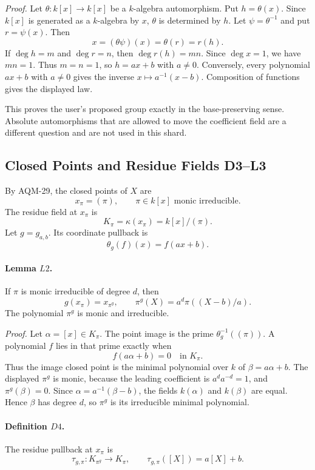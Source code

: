 \emph{Proof.}
Let \(\theta:k[x]\to k[x]\) be a \(k\)-algebra automorphism.  Put
\(h=\theta(x)\).  Since \(k[x]\) is generated as a \(k\)-algebra by \(x\),
\(\theta\) is determined by \(h\).  Let \(\psi=\theta^{-1}\) and put
\(r=\psi(x)\).  Then
\[
  x=(\theta\psi)(x)=\theta(r)=r(h).
\]
If \(\deg h=m\) and \(\deg r=n\), then \(\deg r(h)=mn\).  Since
\(\deg x=1\), we have \(mn=1\).  Thus \(m=n=1\), so \(h=ax+b\) with
\(a\ne0\).  Conversely, every polynomial \(ax+b\) with \(a\ne0\) gives the
inverse \(x\mapsto a^{-1}(x-b)\).  Composition of functions gives the
displayed law.

This proves the user's proposed group exactly in the base-preserving sense.
Absolute automorphisms that are allowed to move the coefficient field are a
different question and are not used in this shard.

\subsection{Closed Points and Residue Fields D3--L3}

By AQM-29, the closed points of \(X\) are
\[
  x_\pi=(\pi),\qquad \pi\in k[x]\text{ monic irreducible}.
\]
The residue field at \(x_\pi\) is
\[
  K_\pi=\kappa(x_\pi)=k[x]/(\pi).
\]
Let \(g=g_{a,b}\).  Its coordinate pullback is
\[
  \theta_g(f)(x)=f(ax+b).
\]

\paragraph{Lemma \(L2\).}
If \(\pi\) is monic irreducible of degree \(d\), then
\[
  g(x_\pi)=x_{\pi^g},\qquad
  \pi^g(X)=a^d\pi((X-b)/a).
\]
The polynomial \(\pi^g\) is monic and irreducible.

\emph{Proof.}
Let \(\alpha=[x]\in K_\pi\).  The point image is the prime
\(\theta_g^{-1}((\pi))\).  A polynomial \(f\) lies in that prime exactly when
\[
  f(a\alpha+b)=0\quad\text{in }K_\pi.
\]
Thus the image closed point is the minimal polynomial over \(k\) of
\(\beta=a\alpha+b\).  The displayed \(\pi^g\) is monic, because the leading
coefficient is \(a^d a^{-d}=1\), and \(\pi^g(\beta)=0\).  Since
\(\alpha=a^{-1}(\beta-b)\), the fields \(k(\alpha)\) and \(k(\beta)\) are
equal.  Hence \(\beta\) has degree \(d\), so \(\pi^g\) is its irreducible
minimal polynomial.

\paragraph{Definition \(D4\).}
The residue pullback at \(x_\pi\) is
\[
  \tau_{g,\pi}:K_{\pi^g}\longrightarrow K_\pi,\qquad
  \tau_{g,\pi}([X])=a[X]+b.
\]

